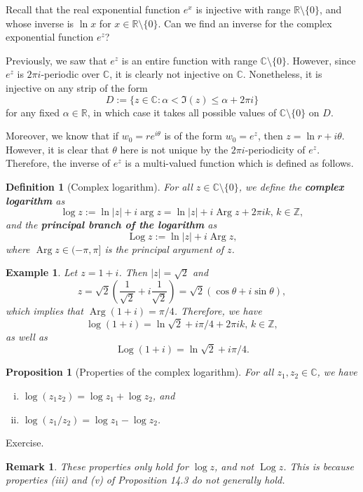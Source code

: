 \documentclass[10pt]{article}
\makeatletter
\newcommand{\R}{\mathbb{R}}
\newcommand{\C}{\mathbb{C}}
\newcommand{\Z}{\mathbb{Z}}
\DeclareMathOperator{\Arg}{Arg}
\DeclareMathOperator{\Log}{Log}
\theoremstyle{newstyle}
\newtheorem{remark}[thm]{Remark}
\newtheorem{prop}[thm]{Proposition}
\newtheorem{defn}[thm]{Definition}
\newtheorem{exmp}[thm]{Example}
\newenvironment{pf}[1][\proofname]{\par
  \pushQED{\qed}%
  \normalfont \topsep0\p@\relax
  \trivlist
  \item[\hskip\labelsep\scshape
  #1\@addpunct{.}]\ignorespaces
}{%
  \popQED\endtrivlist\@endpefalse
}
\makeatother
\begin{document}
Recall that the real exponential function $e^x$ is injective with range $\R \setminus \{0\}$, 
and whose inverse is $\ln x$ for $x \in \R \setminus \{0\}$. Can we find an inverse 
for the complex exponential function $e^z$?

Previously, we saw that $e^z$ is an entire function with range $\C \setminus \{0\}$. However, 
since $e^z$ is $2\pi i$-periodic over $\C$, it is clearly not injective on $\C$. Nonetheless, 
it is injective on any strip of the form 
\[ D := \{z \in \C : \alpha < \Im(z) \leq \alpha + 2\pi i\} \]
for any fixed $\alpha \in \R$, in which case it takes all possible values of $\C \setminus \{0\}$ on $D$.

Moreover, we know that if $w_0 = re^{i\theta}$ is of the form $w_0 = e^z$, then 
$z = \ln r + i\theta$. However, it is clear that $\theta$ here is not unique by the
$2\pi i$-periodicity of $e^z$. Therefore, the inverse of $e^z$ is a multi-valued function 
which is defined as follows. 

\begin{defn}[Complex logarithm]
For all $z \in \C \setminus \{0\}$, we define the {\bf complex logarithm} as 
\[ \log z := \ln|z| + i\arg z = \ln|z| + i \Arg z + 2\pi ik, \, k \in \Z, \]
and the {\bf principal branch of the logarithm} as 
\[ \Log z := \ln |z| + i \Arg z, \]
where $\Arg z \in (-\pi, \pi]$ is the principal argument of $z$. 
\end{defn}

\begin{exmp}
Let $z = 1+i$. Then $|z| = \sqrt2$ and 
\[ z = \sqrt2 \left( \frac1{\sqrt2} + i\frac{1}{\sqrt2} \right) = \sqrt2(\cos\theta + i\sin\theta), \]
which implies that $\Arg(1+i) = \pi/4$. Therefore, we have 
\[ \log(1+i) = \ln \sqrt2 + i\pi/4 + 2\pi ik,\, k \in \Z, \]
as well as 
\[ \Log(1+i) = \ln \sqrt2 + i\pi/4. \]
\end{exmp}

\begin{prop}[Properties of the complex logarithm]
For all $z_1, z_2 \in \C$, we have 
\begin{enumerate}[(i)]
    \item $\log(z_1z_2) = \log z_1 + \log z_2$, and 
    \item $\log(z_1/z_2) = \log z_1 - \log z_2$.
\end{enumerate}
\end{prop}
\begin{pf}
Exercise.
\end{pf}

\begin{remark}
These properties only hold for $\log z$, and not $\Log z$. This is because properties (iii) and (v) 
of Proposition 14.3 do not generally hold.
\end{remark}
\end{document}
